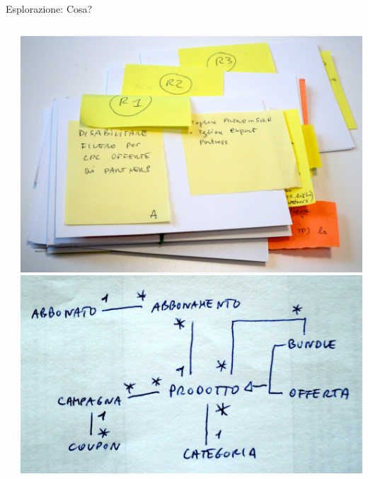 \documentclass[compress, red, 14pt, pdf]{beamer}
\begin{document}
\begin{frame}{Esplorazione: Cosa?}
\begin{columns}[T]
\begin{column}{0.6\textwidth}
	    \end{column}
	    \begin{column}{0.4\textwidth}
			\hspace*{-0.9cm} \includegraphics[scale=0.115]{images/stories}
			\\ \vspace*{0.4cm}
			\hspace*{-0.9cm} \includegraphics[scale=0.13]{images/domain-1}
	    \end{column}
	 \end{columns}
	\end{frame}
	
\end{document}
